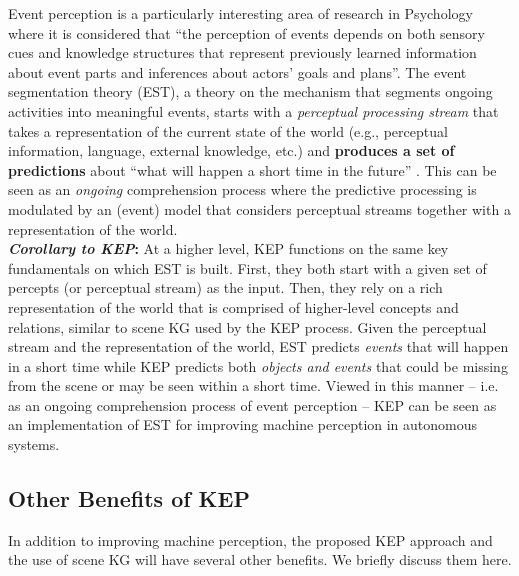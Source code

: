 \documentclass[conference]{IEEEtran}
\begin{document}
\begin{tcolorbox}[title= Connection to Perception in Psychology]
Event perception is a particularly interesting area of research in Psychology where it is considered that ``the perception of events depends on both sensory cues and knowledge structures that represent previously learned information about event parts and inferences about actors’ goals and plans''\cite{zacks2007event}. The event segmentation theory (EST), a theory on the mechanism that segments ongoing activities into meaningful events, starts with a \textit{perceptual processing stream} that takes a representation of the current state of the world (e.g., perceptual information, language, external knowledge, etc.) and \textbf{produces a set of predictions} about ``what will happen a short time in the future'' \cite{zacks2020event}. This can be seen as an \textit{ongoing} comprehension process where the predictive processing is modulated by an (event) model that considers perceptual streams together with a representation of the world.\\ 

\textbf{\textit{Corollary to KEP}:} At a higher level, KEP functions on the same key fundamentals on which EST is built. First, they both start with a given set of percepts (or perceptual stream) as the input. Then, they rely on a rich representation of the world that is comprised of higher-level concepts and relations, similar to scene KG used by the KEP process. Given the perceptual stream and the representation of the world, EST predicts \textit{events} that will happen in a short time while KEP predicts both \textit{objects and events} that could be missing from the scene or may be seen within a short time. Viewed in this manner -- i.e. as an ongoing comprehension process of event perception -- KEP can be seen as an implementation of EST for improving machine perception in autonomous systems.

\end{tcolorbox}

\subsection{Other Benefits of KEP}
In addition to improving machine perception, the proposed KEP approach and the use of scene KG will have several other benefits. We briefly discuss them here.\\
\end{document}
